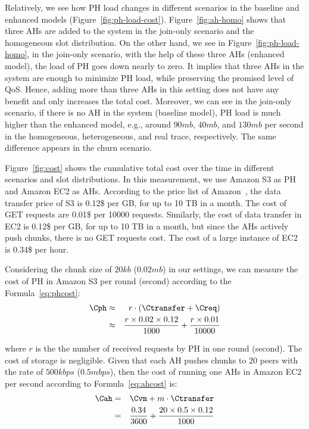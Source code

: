 {Relatively, we see how PH load changes in different scenarios in the baseline
and enhanced models (Figure~\ref{fig:ph-load-cost}). Figure~\ref{fig:ah-homo}
shows that three AHs are added to the system in the join-only scenario and the
homogeneous slot distribution. On the other hand, we see in
Figure~\ref{fig:ph-load-homo}, in the join-only scenario, with the help of
these three AHs (enhanced model), the load of PH goes down nearly to zero. It
implies that three AHs in the system are enough to minimize PH load, while
preserving the promised level of QoS. Hence, adding more than three AHs in
this setting does not have any benefit and only increases the total cost.
Moreover, we can see in the join-only scenario, if there is no AH in the
system (baseline model), PH load is much higher than the enhanced model, e.g.,
around $90mb$, $40mb$, and $130mb$ per second in the homogeneous,
heterogeneous, and real trace, respectively. The same difference appears in
the churn scenario.

Figure~\ref{fig:cost} shows the cumulative total cost over the time in
different scenarios and slot distributions. In this measurement, we use Amazon
S3 as PH and Amazon EC2 as AHs. According to the price list of
Amazon~\cite{amazonec2,amazons3}, the data transfer price of S3 is 0.12\$ per
GB, for up to 10 TB in a month. The cost of GET requests are 0.01\$ per 10000
requests. Similarly, the cost of data transfer in EC2 is 0.12\$ per GB, for up
to 10 TB in a month, but since the AHs actively push chunks, there is no GET
requests cost. The cost of a large instance of EC2 is 0.34\$ per hour.

Considering the chunk size of $20kb$ ($0.02mb$) in our settings, we can
measure the cost of PH in Amazon S3 per round (second) according to the
Formula~\ref{eq:phcost}:
\begin{eqnarray}
\Cph &\approx& r \cdot (\Ctransfer + \Creq) \nonumber \\
&\approx& \frac{r \times 0.02 \times 0.12}{1000} + \frac{r \times 0.01}{10000}
\end{eqnarray}

where $r$ is the the number of received requests by PH in one round (second).
The cost of storage is negligible. Given that each AH pushes chunks to 20
peers with the rate of $500kbps$ ($0.5mbps$), then the cost of running one AHs
in Amazon EC2 per second according to Formula~\ref{eq:ahcost} is:
\begin{eqnarray}
\Cah &=& \Cvm + m \cdot \Ctransfer \nonumber \\
&=& \frac{0.34}{3600} + \frac{20 \times 0.5 \times 0.12}{1000}
\end{eqnarray}

}
